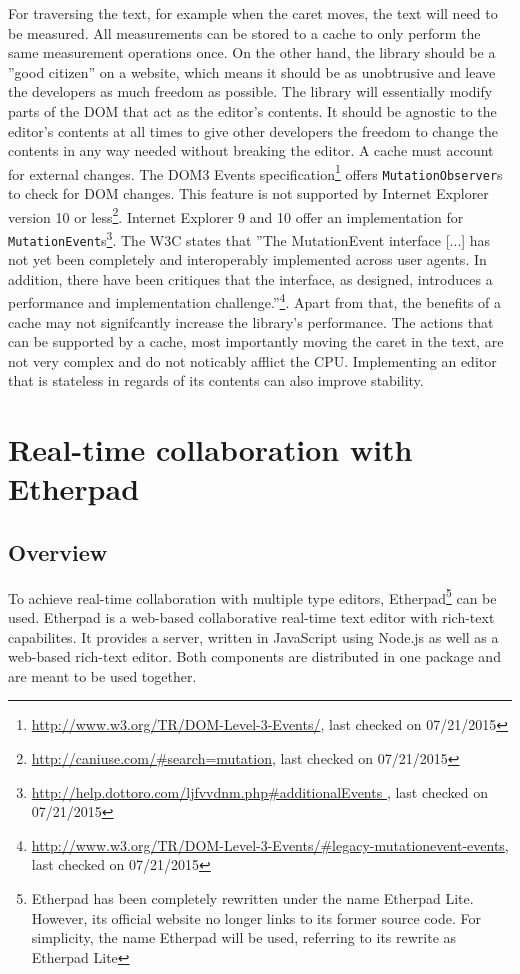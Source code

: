 For traversing the text, for example when the caret moves, the text will need to be measured. All measurements can be stored to a cache to only perform the same measurement operations once. On the other hand, the library should be a ''good citizen'' on a website, which means it should be as unobtrusive and leave the developers as much freedom as possible. The library will essentially modify parts of the DOM that act as the editor's contents. It should be agnostic to the editor's contents at all times to give other developers the freedom to change the contents in any way needed without breaking the editor. A cache must account for external changes. The DOM3 Events specification\footnote{\url{http://www.w3.org/TR/DOM-Level-3-Events/}, last checked on 07/21/2015} offers \texttt{MutationObserver}s to check for DOM changes. This feature is not supported by Internet Explorer version 10 or less\footnote{\url{http://caniuse.com/\#search=mutation}, last checked on 07/21/2015}. Internet Explorer 9 and 10 offer an implementation for \texttt{MutationEvent}s\footnote{\url{http://help.dottoro.com/ljfvvdnm.php\#additionalEvents }, last checked on 07/21/2015}. The W3C states that ''The MutationEvent interface [...] has not yet been completely and interoperably implemented across user agents. In addition, there have been critiques that the interface, as designed, introduces a performance and implementation challenge.''\footnote{\url{http://www.w3.org/TR/DOM-Level-3-Events/\#legacy-mutationevent-events}, last checked on 07/21/2015}. Apart from that, the benefits of a cache may not signifcantly increase the library's performance. The actions that can be supported by a cache, most importantly moving the caret in the text, are not very complex and do not noticably afflict the CPU. Implementing an editor that is stateless in regards of its contents can also improve stability.


\section{Real-time collaboration with Etherpad} 
\label{sec:etherpad}

\subsection{Overview}

To achieve real-time collaboration with multiple type editors, Etherpad\footnote{Etherpad has been completely rewritten under the name Etherpad Lite. However, its official website no longer links to its former source code. For simplicity, the name Etherpad will be used, referring to its rewrite as Etherpad Lite} can be used. Etherpad is a web-based collaborative real-time text editor with rich-text capabilites. It provides a server, written in JavaScript using Node.js as well as a web-based rich-text editor. Both components are distributed in one package and are meant to be used together.

